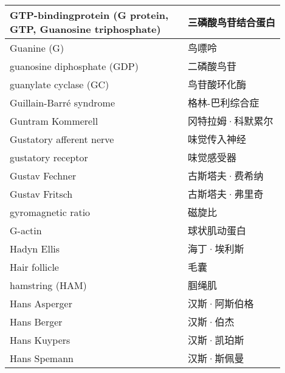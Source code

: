 \begin{longtable}{lll}
	\midrule
	\makecell[l]{GTP-bindingprotein (G protein,\\ GTP, Guanosine triphosphate)}     &&  三磷酸鸟苷结合蛋白  \\
	
	\midrule
	Guanine (G)     &&  鸟嘌呤  \\
	
	\midrule
	guanosine diphosphate (GDP)    &&  二磷酸鸟苷  \\
	
	\midrule
	guanylate cyclase (GC)    &&  鸟苷酸环化酶  \\
	
	\midrule
	Guillain-Barré syndrome   &&  格林-巴利综合症  \\
	
	\midrule
	Guntram Kommerell   &&  冈特拉姆·科默累尔  \\
	
	\midrule
	Gustatory afferent nerve     &&  味觉传入神经  \\
	
	\midrule
	gustatory receptor     &&  味觉感受器  \\
	
	\midrule
	Gustav Fechner     &&  古斯塔夫·费希纳  \\
	
	\midrule
	Gustav Fritsch     &&  古斯塔夫·弗里奇  \\
	
	\midrule
	gyromagnetic ratio     &&  磁旋比  \\
	
	\midrule
	G-actin    &&  球状肌动蛋白  \\
	
	\midrule
	Hadyn Ellis    &&  海丁·埃利斯  \\
	
	\midrule
	Hair follicle    &&  毛囊  \\
	
	\midrule
	hamstring (HAM)    &&  腘绳肌  \\
	
	\midrule
	Hans Asperger    &&  汉斯·阿斯伯格  \\
	
	\midrule
	Hans Berger    &&  汉斯·伯杰  \\
	
	\midrule
	Hans Kuypers    &&  汉斯·凯珀斯  \\
	
	\midrule
	Hans Spemann    &&  汉斯·斯佩曼  \\
	

\end{longtable}
